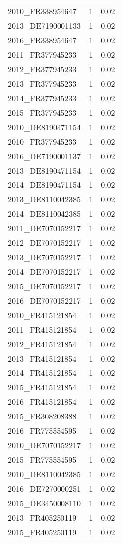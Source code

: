 \begin{table*}[htbp]
\begin{tabular}{lrr}
2010_FR338954647 & 1 & 0.02 \\
2013_DE7190001133 & 1 & 0.02 \\
2016_FR338954647 & 1 & 0.02 \\
2011_FR377945233 & 1 & 0.02 \\
2012_FR377945233 & 1 & 0.02 \\
2013_FR377945233 & 1 & 0.02 \\
2014_FR377945233 & 1 & 0.02 \\
2015_FR377945233 & 1 & 0.02 \\
2010_DE8190471154 & 1 & 0.02 \\
2010_FR377945233 & 1 & 0.02 \\
2016_DE7190001137 & 1 & 0.02 \\
2013_DE8190471154 & 1 & 0.02 \\
2014_DE8190471154 & 1 & 0.02 \\
2013_DE8110042385 & 1 & 0.02 \\
2014_DE8110042385 & 1 & 0.02 \\
2011_DE7070152217 & 1 & 0.02 \\
2012_DE7070152217 & 1 & 0.02 \\
2013_DE7070152217 & 1 & 0.02 \\
2014_DE7070152217 & 1 & 0.02 \\
2015_DE7070152217 & 1 & 0.02 \\
2016_DE7070152217 & 1 & 0.02 \\
2010_FR415121854 & 1 & 0.02 \\
2011_FR415121854 & 1 & 0.02 \\
2012_FR415121854 & 1 & 0.02 \\
2013_FR415121854 & 1 & 0.02 \\
2014_FR415121854 & 1 & 0.02 \\
2015_FR415121854 & 1 & 0.02 \\
2016_FR415121854 & 1 & 0.02 \\
2015_FR308208388 & 1 & 0.02 \\
2016_FR775554595 & 1 & 0.02 \\
2010_DE7070152217 & 1 & 0.02 \\
2015_FR775554595 & 1 & 0.02 \\
2010_DE8110042385 & 1 & 0.02 \\
2016_DE7270000251 & 1 & 0.02 \\
2015_DE3450008110 & 1 & 0.02 \\
2013_FR405250119 & 1 & 0.02 \\
2015_FR405250119 & 1 & 0.02 \\

\end{tabular}
\end{table*}
